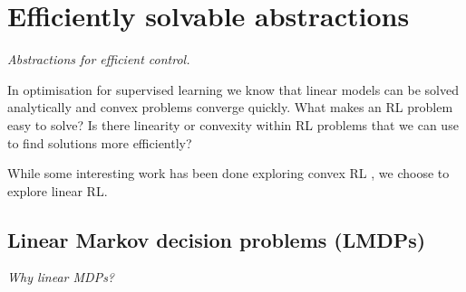 \newpage
\section{Efficiently solvable abstractions}\label{solveable-abstractions}

\begin{displayquote}
  \textsl{Abstractions for efficient control.}
\end{displayquote}


In optimisation for supervised learning we know that
linear models can be solved analytically and convex problems converge quickly.
What makes an RL problem easy to solve? Is there linearity or convexity
within RL problems that we can use to find solutions more efficiently?


While some interesting work has been done exploring convex RL \cite{ODonoghue2012a, Barratt2019},
we choose to explore linear RL.

\subsection{Linear Markov decision problems (LMDPs)}

\begin{displayquote}
\textsl{Why linear MDPs?}
\end{displayquote}


%


